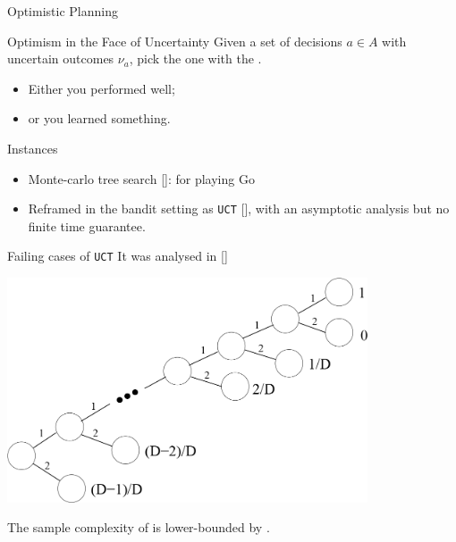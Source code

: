 \documentclass{beamer}
\begin{document}
\begin{frame}{Optimistic Planning}
    
    \begin{exampleblock}{Optimism in the Face of Uncertainty}
    Given a set of decisions $a\in A$ with uncertain outcomes $\nu_a$, pick the one with the .\pause
    
    \begin{itemize}
        \item Either you performed well;\pause
        \item or you learned something.\pause
    \end{itemize}
    \end{exampleblock}
    
    \begin{block}{Instances}
    \begin{itemize}
        \item Monte-carlo tree search [\cite{Coulom2006}]: for playing Go
        \item Reframed in the bandit setting as \texttt{UCT} [\cite{Kocsis2006}], with an asymptotic analysis but no finite time guarantee.
    \end{itemize}
    \end{block}
\end{frame}


\begin{frame}{Failing cases of \texttt{UCT}}
    It was analysed in [\cite{Coquelin2007}]
    \begin{center}
    \includegraphics[width=0.8\textwidth]{img/uct_fail}
    \end{center}
    The sample complexity of is lower-bounded by .
\end{frame}
\end{document}
